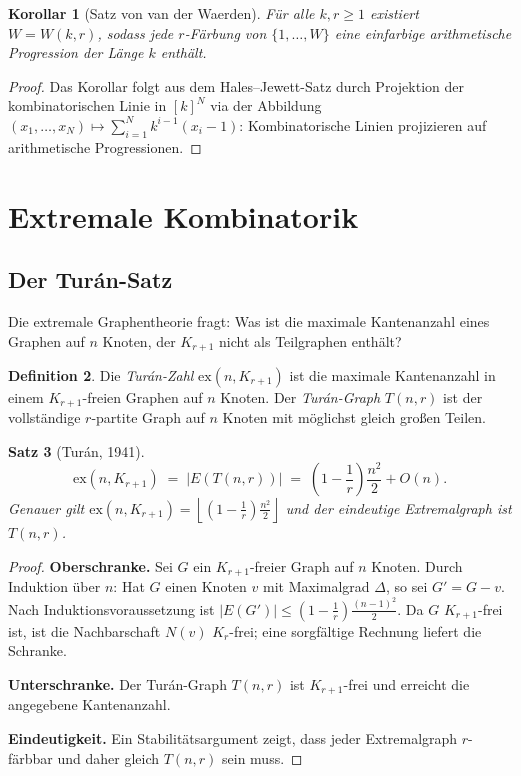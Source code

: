 \documentclass[12pt,a4paper]{amsart}
\newtheorem{theorem}{Satz}[section]
\newtheorem{corollary}[theorem]{Korollar}
\theoremstyle{definition}
\newtheorem{definition}[theorem]{Definition}
\theoremstyle{remark}
\begin{document}
\begin{corollary}[Satz von van der Waerden]
F\"ur alle $k,r \ge 1$ existiert $W = W(k,r)$, sodass jede $r$-F\"arbung von
$\{1,\ldots,W\}$ eine einfarbige arithmetische Progression der L\"ange $k$ enth\"alt.
\end{corollary}

\begin{proof}
Das Korollar folgt aus dem Hales--Jewett-Satz durch Projektion der kombinatorischen
Linie in $[k]^N$ via der Abbildung $(x_1,\ldots,x_N) \mapsto \sum_{i=1}^N k^{i-1}(x_i-1)$:
Kombinatorische Linien projizieren auf arithmetische Progressionen.
\end{proof}

\section{Extremale Kombinatorik}

\subsection{Der Tur\'an-Satz}

Die extremale Graphentheorie fragt: Was ist die maximale Kantenanzahl eines
Graphen auf $n$ Knoten, der $K_{r+1}$ nicht als Teilgraphen enth\"alt?

\begin{definition}
Die \emph{Tur\'an-Zahl} $\mathrm{ex}(n, K_{r+1})$ ist die maximale Kantenanzahl
in einem $K_{r+1}$-freien Graphen auf $n$ Knoten.  Der \emph{Tur\'an-Graph}
$T(n,r)$ ist der vollst\"andige $r$-partite Graph auf $n$ Knoten mit m\"oglichst
gleich gro\ss{}en Teilen.
\end{definition}

\begin{theorem}[Tur\'an, 1941]\label{satz:turan}
\[
  \mathrm{ex}(n, K_{r+1}) \;=\; |E(T(n,r))| \;=\; \left(1 - \frac{1}{r}\right)\frac{n^2}{2}
  + O(n).
\]
Genauer gilt $\mathrm{ex}(n, K_{r+1}) = \left\lfloor\left(1-\frac{1}{r}\right)\frac{n^2}{2}\right\rfloor$
und der eindeutige Extremalgraph ist $T(n,r)$.
\end{theorem}

\begin{proof}
\textbf{Oberschranke.}  Sei $G$ ein $K_{r+1}$-freier Graph auf $n$ Knoten.
Durch Induktion \"uber $n$: Hat $G$ einen Knoten $v$ mit Maximalgrad $\Delta$,
so sei $G' = G - v$.  Nach Induktionsvoraussetzung ist
$|E(G')| \le \left(1-\frac{1}{r}\right)\frac{(n-1)^2}{2}$.
Da $G$ $K_{r+1}$-frei ist, ist die Nachbarschaft $N(v)$ $K_r$-frei; eine sorgf\"altige
Rechnung liefert die Schranke.

\textbf{Unterschranke.}  Der Tur\'an-Graph $T(n,r)$ ist $K_{r+1}$-frei und erreicht
die angegebene Kantenanzahl.

\textbf{Eindeutigkeit.}  Ein Stabilit\"atsargument zeigt, dass jeder Extremalgraph
$r$-f\"arbbar und daher gleich $T(n,r)$ sein muss.
\end{proof}
\end{document}
